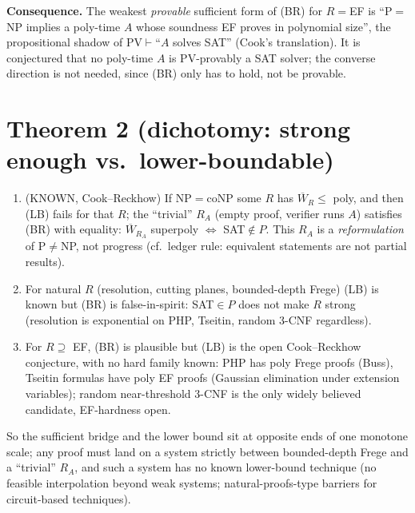 \documentclass[11pt]{article}
\newcommand{\Wb}{\overline W}
\begin{document}
\textbf{Consequence.} The weakest \emph{provable} sufficient form of (BR) for
$R=$EF is ``P$=$NP implies a poly-time $A$ whose soundness EF proves in polynomial size'',
the propositional shadow of PV$\vdash$``$A$ solves SAT'' (Cook's translation). It is
conjectured that no poly-time $A$ is PV-provably a SAT solver; the converse
direction is not needed, since (BR) only has to hold, not be provable.

\section{Theorem 2 (dichotomy: strong enough vs.\ lower-boundable)}
\begin{enumerate}
\item (KNOWN, Cook--Reckhow) If NP$=$coNP some $R$ has $\Wb_R\le$ poly, and then
(LB) fails for that $R$; the ``trivial'' $R_A$ (empty proof, verifier runs $A$)
satisfies (BR) with equality: $\Wb_{R_A}$ superpoly $\iff$ SAT$\notin P$.
This $R_A$ is a \emph{reformulation} of P$\ne$NP, not progress (cf.\ ledger
rule: equivalent statements are not partial results).
\item For natural $R$ (resolution, cutting planes, bounded-depth Frege) (LB) is
known but (BR) is false-in-spirit: SAT$\in P$ does not make $R$ strong
(resolution is exponential on PHP, Tseitin, random 3-CNF regardless).
\item For $R\supseteq$ EF, (BR) is plausible but (LB) is the open Cook--Reckhow
conjecture, with no hard family known: PHP has poly Frege proofs (Buss), Tseitin
formulas have poly EF proofs (Gaussian elimination under extension variables);
random near-threshold 3-CNF is the only widely believed candidate, EF-hardness open.
\end{enumerate}
So the sufficient bridge and the lower bound sit at opposite ends of one monotone
scale; any proof must land on a system strictly between bounded-depth Frege and a
``trivial'' $R_A$, and such a system has no known lower-bound technique (no feasible
interpolation beyond weak systems; natural-proofs-type barriers for circuit-based
techniques).
\end{document}
